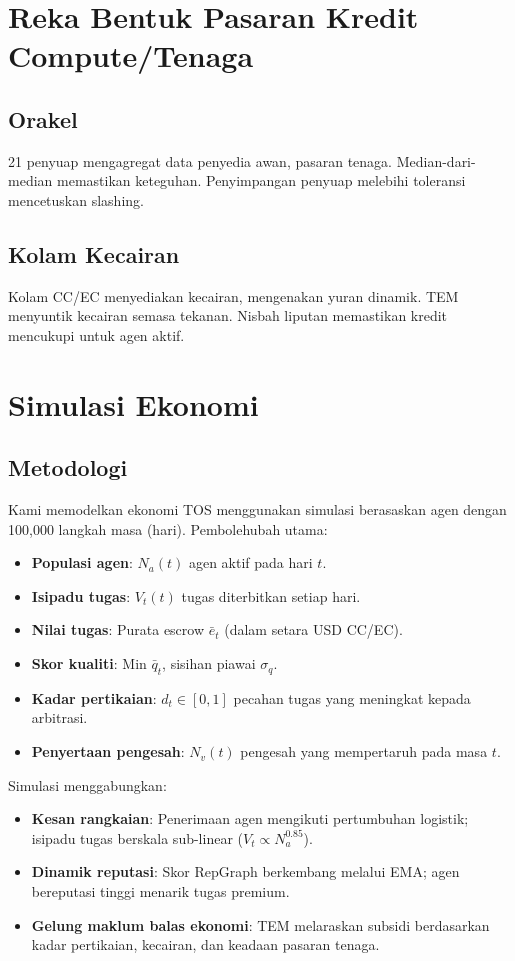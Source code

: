 \documentclass[11pt]{article}
\begin{document}
\section{Reka Bentuk Pasaran Kredit Compute/Tenaga}
\subsection{Orakel}
21 penyuap mengagregat data penyedia awan, pasaran tenaga. Median-dari-median memastikan keteguhan. Penyimpangan penyuap melebihi toleransi mencetuskan slashing.

\subsection{Kolam Kecairan}
Kolam CC/EC menyediakan kecairan, mengenakan yuran dinamik. TEM menyuntik kecairan semasa tekanan. Nisbah liputan memastikan kredit mencukupi untuk agen aktif.

\section{Simulasi Ekonomi}
\label{sec:econ-sim}

\subsection{Metodologi}
Kami memodelkan ekonomi TOS menggunakan simulasi berasaskan agen dengan 100,000 langkah masa (hari). Pembolehubah utama:
\begin{itemize}[noitemsep]
  \item \textbf{Populasi agen}: $N_a(t)$ agen aktif pada hari $t$.
  \item \textbf{Isipadu tugas}: $V_t(t)$ tugas diterbitkan setiap hari.
  \item \textbf{Nilai tugas}: Purata escrow $\bar{e}_t$ (dalam setara USD CC/EC).
  \item \textbf{Skor kualiti}: Min $\bar{q}_t$, sisihan piawai $\sigma_q$.
  \item \textbf{Kadar pertikaian}: $d_t \in [0,1]$ pecahan tugas yang meningkat kepada arbitrasi.
  \item \textbf{Penyertaan pengesah}: $N_v(t)$ pengesah yang mempertaruh pada masa $t$.
\end{itemize}
Simulasi menggabungkan:
\begin{itemize}[noitemsep]
  \item \textbf{Kesan rangkaian}: Penerimaan agen mengikuti pertumbuhan logistik; isipadu tugas berskala sub-linear ($V_t \propto N_a^{0.85}$).
  \item \textbf{Dinamik reputasi}: Skor RepGraph berkembang melalui EMA; agen bereputasi tinggi menarik tugas premium.
  \item \textbf{Gelung maklum balas ekonomi}: TEM melaraskan subsidi berdasarkan kadar pertikaian, kecairan, dan keadaan pasaran tenaga.
\end{itemize}
\end{document}
